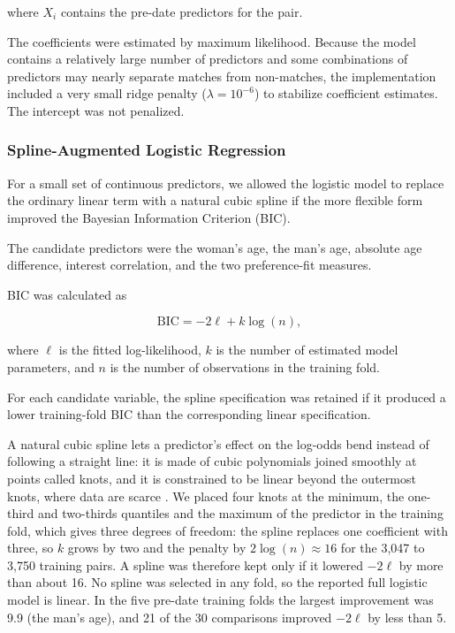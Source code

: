 \documentclass[11pt,letterpaper,reqno]{amsart}
\numberwithin{equation}{subsection}
\theoremstyle{definition}
\numberwithin{thm}{subsection}
\begin{document}
where $X_i$ contains the pre-date predictors for the pair.

The coefficients were estimated by maximum likelihood. Because the model contains a relatively large number of predictors and some combinations of predictors may nearly separate matches from non-matches, the implementation included a very small ridge penalty ($\lambda=10^{-6}$) to stabilize coefficient estimates. The intercept was not penalized.

\subsubsection{Spline-Augmented Logistic Regression}

For a small set of continuous predictors, we allowed the logistic model to replace the ordinary linear term with a natural cubic spline if the more flexible form improved the Bayesian Information Criterion (BIC).

The candidate predictors were the woman's age, the man's age, absolute age difference, interest correlation, and the two preference-fit measures.

BIC was calculated as

\begin{equation}
\mathrm{BIC}
=
-2\ell
+
k\log(n),
\end{equation}

where $\ell$ is the fitted log-likelihood, $k$ is the number of estimated model parameters, and $n$ is the number of observations in the training fold.

For each candidate variable, the spline specification was retained if it produced a lower training-fold BIC than the corresponding linear specification.

A natural cubic spline lets a predictor's effect on the log-odds bend instead of following a straight line: it is made of cubic polynomials joined smoothly at points called knots, and it is constrained to be linear beyond the outermost knots, where data are scarce \cite[Section 7.4.3, p.~297]{James:2023}. We placed four knots at the minimum, the one-third and two-thirds quantiles and the maximum of the predictor in the training fold, which gives three degrees of freedom: the spline replaces one coefficient with three, so $k$ grows by two and the penalty by $2\log(n)\approx 16$ for the 3{,}047 to 3{,}750 training pairs. A spline was therefore kept only if it lowered $-2\ell$ by more than about 16. No spline was selected in any fold, so the reported full logistic model is linear. In the five pre-date training folds the largest improvement was 9.9 (the man's age), and 21 of the 30 comparisons improved $-2\ell$ by less than 5.
\end{document}
